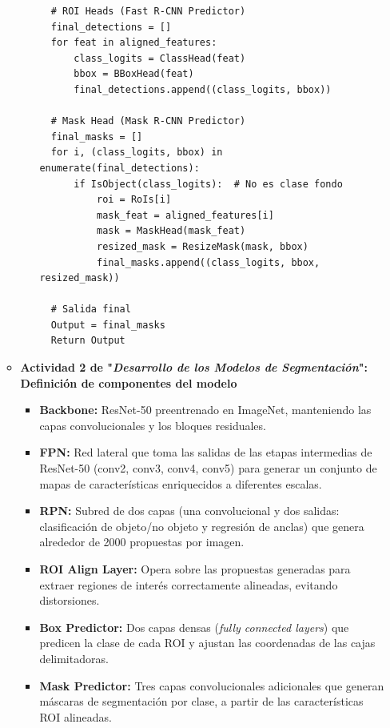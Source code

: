 \begin{enumerate}
\begin{itemize}
\begin{itemize}
\begin{verbatim}
  # ROI Heads (Fast R-CNN Predictor)
  final_detections = []
  for feat in aligned_features:
      class_logits = ClassHead(feat)
      bbox = BBoxHead(feat)
      final_detections.append((class_logits, bbox))
  
  # Mask Head (Mask R-CNN Predictor)
  final_masks = []
  for i, (class_logits, bbox) in enumerate(final_detections):
      if IsObject(class_logits):  # No es clase fondo
          roi = RoIs[i]
          mask_feat = aligned_features[i]
          mask = MaskHead(mask_feat)
          resized_mask = ResizeMask(mask, bbox)
          final_masks.append((class_logits, bbox, resized_mask))
  
  # Salida final
  Output = final_masks
  Return Output
  \end{verbatim}
  
\end{itemize}

\item\textbf{Actividad 2 de "\textit{Desarrollo de los Modelos de Segmentación}": Definición de componentes del modelo}
  

\begin{itemize}
    \item \textbf{Backbone:} ResNet-50 preentrenado en ImageNet, manteniendo las capas convolucionales y los bloques residuales. 
    
    \item \textbf{FPN:} Red lateral que toma las salidas de las etapas intermedias de ResNet-50 (conv2, conv3, conv4, conv5) para generar un conjunto de mapas de características enriquecidos a diferentes escalas.
    
    \item \textbf{RPN:} Subred de dos capas (una convolucional y dos salidas: clasificación de objeto/no objeto y regresión de anclas) que genera alrededor de 2000 propuestas por imagen.
    
    \item \textbf{ROI Align Layer:} Opera sobre las propuestas generadas para extraer regiones de interés correctamente alineadas, evitando distorsiones.
    
    \item \textbf{Box Predictor:} Dos capas densas (\textit{fully connected layers}) que predicen la clase de cada ROI y ajustan las coordenadas de las cajas delimitadoras.
    
    \item \textbf{Mask Predictor:} Tres capas convolucionales adicionales que generan máscaras de segmentación por clase, a partir de las características ROI alineadas.
    

\end{itemize}
\end{itemize}
\end{enumerate}

